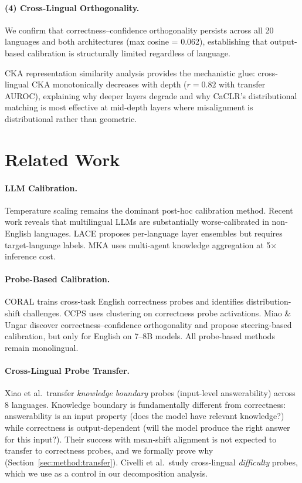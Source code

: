 \documentclass[11pt,a4paper]{article}
\begin{document}
\paragraph{(4) Cross-Lingual Orthogonality.}
We confirm that correctness--confidence orthogonality persists across all 20 languages and both architectures (max cosine = 0.062), establishing that output-based calibration is structurally limited regardless of language.

CKA representation similarity analysis provides the mechanistic glue: cross-lingual CKA monotonically decreases with depth ($r=0.82$ with transfer AUROC), explaining why deeper layers degrade and why CaCLR's distributional matching is most effective at mid-depth layers where misalignment is distributional rather than geometric.


\section{Related Work}
\label{sec:related}

\paragraph{LLM Calibration.}
Temperature scaling \cite{guo2017calibration} remains the dominant post-hoc calibration method.
Recent work reveals that multilingual LLMs are substantially worse-calibrated in non-English languages.
LACE proposes per-language layer ensembles but requires target-language labels.
MKA uses multi-agent knowledge aggregation at 5$\times$ inference cost.

\paragraph{Probe-Based Calibration.}
CORAL trains cross-task English correctness probes and identifies distribution-shift challenges.
CCPS uses clustering on correctness probe activations.
Miao \& Ungar discover correctness--confidence orthogonality and propose steering-based calibration, but only for English on 7--8B models.
All probe-based methods remain monolingual.

\paragraph{Cross-Lingual Probe Transfer.}
Xiao et al.\ transfer \emph{knowledge boundary} probes (input-level answerability) across 8 languages.
Knowledge boundary is fundamentally different from correctness: answerability is an input property (does the model have relevant knowledge?) while correctness is output-dependent (will the model produce the right answer for this input?).
Their success with mean-shift alignment is not expected to transfer to correctness probes, and we formally prove why (Section~\ref{sec:method:transfer}).
Civelli et al.\ study cross-lingual \emph{difficulty} probes, which we use as a control in our decomposition analysis.
\end{document}
